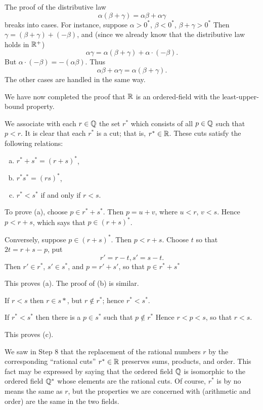 The proof of the distributive law
\begin{equation*}
    \alpha(\beta + \gamma) = \alpha\beta + \alpha\gamma
\end{equation*}
breaks into cases. 
For instance, suppose $\alpha> 0^*$, $\beta <0^*$, $\beta + \gamma > 0^*$ 
Then $\gamma = (\beta + \gamma) + (- \beta)$, 
and (since we already know that the distributive law holds in ${\protect\mathbb R}^+$)
\begin{equation*}
    \alpha\gamma = \alpha(\beta+\gamma) + \alpha \cdot (-\beta).
\end{equation*}
But $\alpha \cdot (-\beta) = -(\alpha\beta)$. Thus
\begin{equation*}
    \alpha\beta + \alpha\gamma = \alpha(\beta + \gamma).
\end{equation*}
The other cases are handled in the same way.

We have now completed the proof that 
${\protect\mathbb R}$ is an ordered-field with the least-upper-bound property.

We associate with each $r\in {\protect\mathbb Q}$ the set $r^*$ 
which consists of all $p \in {\protect\mathbb Q}$ such that $p < r$. 
It is clear that each $r^*$ is a cut; 
that is, $r^* \in {\protect\mathbb R}$. 
These cuts satisfy the following relations:
\begin{enumerate}[(a)]
    \item $r^* + s^* = (r+s)^*$,
    \item $r^* s^* = (rs)^*$,
    \item $r^* < s^*$ if and only if $r < s$.
\end{enumerate}

To prove (a), choose $p \in r^* + s^*$. Then $p=u+v$, where $u<r$, $v<s$.
Hence $p < r +s$, which says that $p \in (r + s)^*$.

Conversely, suppose $p \in (r+s)^*$. Then $p < r + s$. Choose $t$ so that
$2t = r + s - p$, put
\begin{equation*}
    r' = r - t, 
    s' = s - t.
\end{equation*}
Then $r' \in r^*$, $s' \in s^*$, and $p = r' + s'$, so that $p \in r^* + s^*$

This proves (a). The proof of (b) is similar.

If $r < s$ then $r \in s*$, but $r \not\in r^*$; 
hence $r^* < s^*$.

If $r^* <s^*$ then there is a $p \in s^*$ 
such that $p \not\in r^*$ 
Hence $r < p < s$, so that $r < s$.

This proves (c).

We saw in Step 8 that the replacement of the rational numbers $r$ 
by the corresponding ``rational cuts'' $r^* \in {\protect\mathbb R}$ preserves sums, products, and order. 
This fact may be expressed by saying that 
the ordered field ${\protect\mathbb Q}$ is isomorphic to the ordered field ${\protect\mathbb Q}^*$ 
whose elements are the rational cuts. 
Of course, $r^*$ is by no means the same as $r$, 
but the properties we are concerned with (arithmetic and order) are the same in the two fields.


